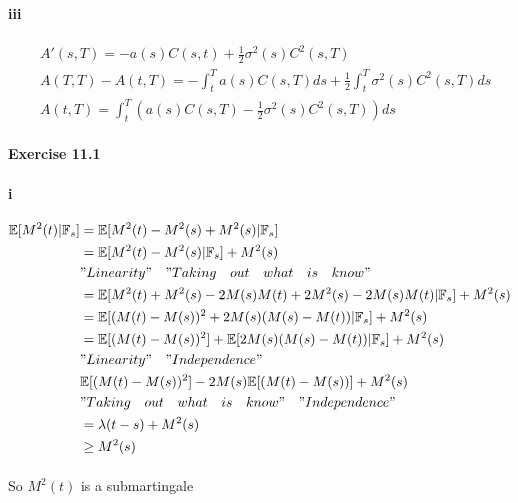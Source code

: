 \documentclass{article}
\begin{document}
\paragraph{iii}
\begin{align*}
  &A'(s,T)  =-a(s)C(s,t)+\frac{1}{2}\sigma^2(s)C^2(s,T) \\
  &A(T,T)-A(t,T)  =-\int_{t}^{T}a(s)C(s,T)ds+\frac{1}{2}\int_{t}^{T}\sigma^2(s)C^2(s,T)ds\\
  &A(t,T)=\int_{t}^{T}(a(s)C(s,T)-\frac{1}{2}\sigma^2(s)C^2(s,T))ds
\end{align*}
\paragraph{Exercise 11.1}
\paragraph{i}
\begin{align*}
  \mathbb{E}[M^2(t)|\mathbb{F}_s] &=\mathbb{E}[M^2(t)-M^2(s)+M^2(s)|\mathbb{F}_s]  \\
   & =\mathbb{E}[M^2(t)-M^2(s)|\mathbb{F}_s]+M^2(s) \\
   &"Linearity" \quad "Taking \quad out\quad  what\quad  is\quad  know"\\
 & =\mathbb{E}[M^2(t)+M^2(s)-2M(s)M(t)+2M^2(s)-2M(s)M(t)|\mathbb{F}_s]+M^2(s)\\
 &=\mathbb{E}[(M(t)-M(s))^2+2M(s)(M(s)-M(t))|\mathbb{F}_s]+M^2(s)\\
 &=\mathbb{E}[(M(t)-M(s))^2]+\mathbb{E}[2M(s)(M(s)-M(t))|\mathbb{F}_s]+M^2(s)\\
 &"Linearity" \quad "Independence"\\
 &\mathbb{E}[(M(t)-M(s))^2]-2M(s)\mathbb{E}[(M(t)-M(s))]+M^2(s)\\
 &"Taking \quad out\quad  what\quad  is\quad  know"\quad "Independence"\\
 &=\lambda(t-s)+M^2(s)\\
 &\ge M^2(s)
\end{align*}
\paragraph{}{So $M^2(t)$ is a submartingale}
\end{document}
